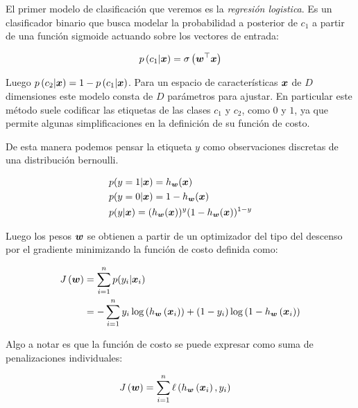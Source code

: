El primer modelo de clasificación que veremos es la \emph{regresión logistica}. Es un
clasificador binario que busca modelar la probabilidad a posterior de $c_1$ a
partir de una función sigmoide actuando sobre los vectores de
entrada:

\begin{align}
    p\left( c_1 | \boldsymbol{x} \right) = \sigma\left( \boldsymbol{w}^{\top} \boldsymbol{x} \right)
\end{align}

Luego $p\left( c_2 | \boldsymbol{x} \right) = 1 - p\left( c_1 | \boldsymbol{x} \right)$.
Para un espacio de características $\boldsymbol{x}$ de $D$ dimensiones este modelo
consta de $D$ parámetros para ajustar. En particular este método suele codificar
las etiquetas de las clases $c_1$ y $c_2$, como $0$ y $1$, ya que permite
algunas simplificaciones en la definición de su función de costo.

De esta manera podemos pensar la etiqueta $y$ como observaciones discretas de una
distribución bernoulli.

\begin{align}
    & p(y = 1 | \boldsymbol{x}) = h_{\boldsymbol{w}}(\boldsymbol{x}) \\
    & p(y = 0 | \boldsymbol{x}) = 1 - h_{\boldsymbol{w}}(\boldsymbol{x}) \\
    & p(y | \boldsymbol{x}) = (h_{\boldsymbol{w}}(\boldsymbol{x}))^{y}(1 - h_{\boldsymbol{w}}(\boldsymbol{x}))^{1 - y}
\end{align}

Luego los pesos $\boldsymbol{w}$ se obtienen a partir de un optimizador del tipo del
descenso por el gradiente minimizando la función de costo definida como:

\begin{align}
    J\left( \boldsymbol{w} \right) &= \sum_{i=1}^{n} p(y_{i} | \boldsymbol{x}_{i}) \\
                             &= -\sum_{i=1}^{n}
                                    y_{i}\log\left( h_{\boldsymbol{w}}\left( \boldsymbol{x}_{i} \right) \right) +
                                    (1 - y_{i})\log\left(1 - h_{\boldsymbol{w}}\left( \boldsymbol{x}_{i} \right) \right)
\end{align}

Algo a notar es que la función de costo se puede expresar como suma de penalizaciones
individuales:

\begin{align}
    J\left( \boldsymbol{w} \right) &= \sum_{i=1}^{n} \ell\left( h_{\boldsymbol{w}}\left( \boldsymbol{x}_{i}\right), y_{i}\right)
\end{align}

